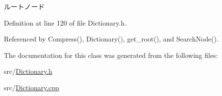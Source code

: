 ルートノード 



Definition at line 120 of file Dictionary.\-h.



Referenced by Compress(), Dictionary(), get\-\_\-root(), and Search\-Node().



The documentation for this class was generated from the following files\-:\begin{DoxyCompactItemize}
\item 
src/\hyperlink{Dictionary_8h}{Dictionary.\-h}\item 
src/\hyperlink{Dictionary_8cpp}{Dictionary.\-cpp}\end{DoxyCompactItemize}
